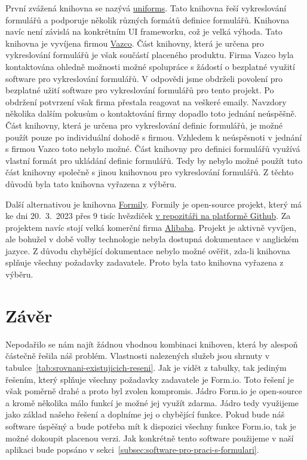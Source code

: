První zvážená knihovna se nazývá \href{https://uniforms.tools/}{uniforms}.
Tato knihovna řeší vykreslování formulářů a podporuje několik různých formátů definice formulářů.
Knihovna navíc není závislá na konkrétním UI frameworku, což je velká výhoda.
Tato knihovna je vyvíjena firmou \href{https://www.vazco.eu/}{Vazco}.
Část knihovny, která je určena pro vykreslování formulářů je však součástí placeného produktu.
Firma Vazco byla kontaktována ohledně možnosti možné spolupráce s žádostí o bezplatné využití software pro vykreslování formulářů.
V odpovědi jsme obdrželi povolení pro bezplatné užití software pro vykreslování formulářů pro tento projekt.
Po obdržení potvrzení však firma přestala reagovat na veškeré emaily.
Navzdory několika dalším pokusům o kontaktování firmy dopadlo toto jednání neúspěšně.
Část knihovny, která je určena pro vykreslování definic formulářů, je možné použít pouze po individuální dohodě s firmou.
Vzhledem k neúspěsnoti v jednání s firmou Vazco toto nebylo možné.
Část knihovny pro definici formulářů využívá vlastní formát pro ukládání definic formulářů.
Tedy by nebylo možné použít tuto část knihovny společně s jinou knihovnou pro vykreslování formulářů.
Z těchto důvodů byla tato knihovna vyřazena z výběru.

Další alternativou je knihovna \href{https://formilyjs.org/}{Formily}.
Formily je open-source projekt, který má ke dni 20.\ 3.\ 2023 přes 9 tisíc hvězdiček \href{https://github.com/alibaba/formily}{v repozitáři na platformě Github}.
Za projektem navíc stojí velká komerční firma \href{https://www.alibaba.com/}{Alibaba}.
Projekt je aktivně vyvíjen, ale bohužel v době volby technologie nebyla dostupná dokumentace v anglickém jazyce.
Z důvodu chybějící dokumentace nebylo možné ověřit, zda-li knihovna splňuje všechny požadavky zadavatele.
Proto byla tato knihovna vyřazena z výběru.

\section*{Závěr}\label{sec:zaver-analyzy-existujicich-reseni}

Nepodařilo se nám najít žádnou vhodnou kombinaci knihoven, která by alespoň částečně řešila náš problém.
Vlastnosti nalezených služeb jsou shrnuty v tabulce~\ref{tab:srovnani-existujicich-reseni}.
Jak je vidět z tabulky, tak jediným řešením, který splňuje všechny požadavky zadavatele je Form.io.
Toto řešení je však poměrně drahé a proto byl zvolen kompromis.
Jádro Form.io je open-source a kromě několika málo funkcí je možné jej využít zdarma.
Jádro tedy využijeme jako základ našeho řešení a doplníme jej o chybějící funkce.
Pokud bude náš software úspěšný a bude potřeba mít k dispozici všechny funkce Form.io, tak je možné dokoupit placenou verzi.
Jak konkrétně tento software použijeme v naší aplikaci bude popsáno v sekci~\ref{subsec:software-pro-praci-s-formulari}.

